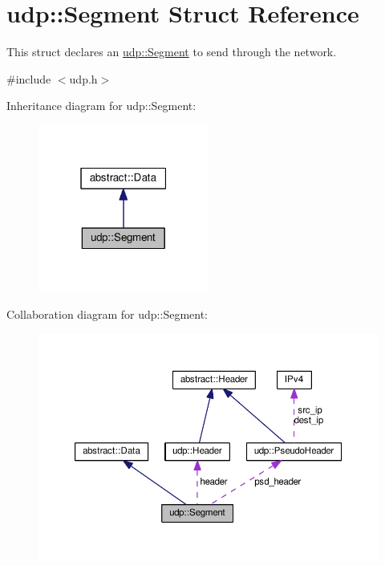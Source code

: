\hypertarget{structudp_1_1Segment}{}\section{udp\+:\+:Segment Struct Reference}
\label{structudp_1_1Segment}


This struct declares an \hyperlink{structudp_1_1Segment}{udp\+::\+Segment} to send through the network.  




{\ttfamily \#include $<$udp.\+h$>$}



Inheritance diagram for udp\+:\+:Segment\+:\nopagebreak
\begin{figure}[H]
\begin{center}
\leavevmode
\includegraphics[width=159pt]{structudp_1_1Segment__inherit__graph}
\end{center}
\end{figure}


Collaboration diagram for udp\+:\+:Segment\+:\nopagebreak
\begin{figure}[H]
\begin{center}
\leavevmode
\includegraphics[width=350pt]{structudp_1_1Segment__coll__graph}
\end{center}
\end{figure}
